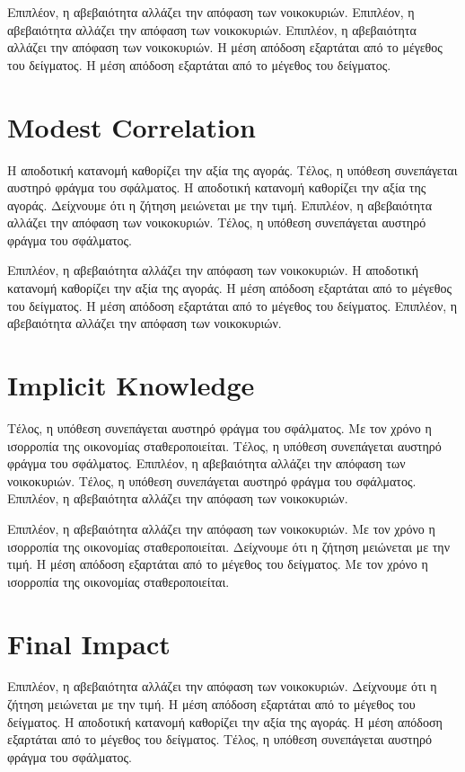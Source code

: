 \documentclass[11pt]{article}
\begin{document}
Επιπλέον, η αβεβαιότητα αλλάζει την απόφαση των νοικοκυριών. Επιπλέον, η αβεβαιότητα αλλάζει την απόφαση των νοικοκυριών. Επιπλέον, η αβεβαιότητα αλλάζει την απόφαση των νοικοκυριών. Η μέση απόδοση εξαρτάται από το μέγεθος του δείγματος. Η μέση απόδοση εξαρτάται από το μέγεθος του δείγματος.

\section{Modest Correlation}\label{sec:16}

Η αποδοτική κατανομή καθορίζει την αξία της αγοράς. Τέλος, η υπόθεση συνεπάγεται αυστηρό φράγμα του σφάλματος. Η αποδοτική κατανομή καθορίζει την αξία της αγοράς. Δείχνουμε ότι η ζήτηση μειώνεται με την τιμή. Επιπλέον, η αβεβαιότητα αλλάζει την απόφαση των νοικοκυριών. Τέλος, η υπόθεση συνεπάγεται αυστηρό φράγμα του σφάλματος.

Επιπλέον, η αβεβαιότητα αλλάζει την απόφαση των νοικοκυριών. Η αποδοτική κατανομή καθορίζει την αξία της αγοράς. Η μέση απόδοση εξαρτάται από το μέγεθος του δείγματος. Η μέση απόδοση εξαρτάται από το μέγεθος του δείγματος. Επιπλέον, η αβεβαιότητα αλλάζει την απόφαση των νοικοκυριών.

\section{Implicit Knowledge}\label{sec:17}

Τέλος, η υπόθεση συνεπάγεται αυστηρό φράγμα του σφάλματος. Με τον χρόνο η ισορροπία της οικονομίας σταθεροποιείται. Τέλος, η υπόθεση συνεπάγεται αυστηρό φράγμα του σφάλματος. Επιπλέον, η αβεβαιότητα αλλάζει την απόφαση των νοικοκυριών. Τέλος, η υπόθεση συνεπάγεται αυστηρό φράγμα του σφάλματος. Επιπλέον, η αβεβαιότητα αλλάζει την απόφαση των νοικοκυριών.

Επιπλέον, η αβεβαιότητα αλλάζει την απόφαση των νοικοκυριών. Με τον χρόνο η ισορροπία της οικονομίας σταθεροποιείται. Δείχνουμε ότι η ζήτηση μειώνεται με την τιμή. Η μέση απόδοση εξαρτάται από το μέγεθος του δείγματος. Με τον χρόνο η ισορροπία της οικονομίας σταθεροποιείται.

\section{Final Impact}\label{sec:18}

Επιπλέον, η αβεβαιότητα αλλάζει την απόφαση των νοικοκυριών. Δείχνουμε ότι η ζήτηση μειώνεται με την τιμή. Η μέση απόδοση εξαρτάται από το μέγεθος του δείγματος. Η αποδοτική κατανομή καθορίζει την αξία της αγοράς. Η μέση απόδοση εξαρτάται από το μέγεθος του δείγματος. Τέλος, η υπόθεση συνεπάγεται αυστηρό φράγμα του σφάλματος.
\end{document}
